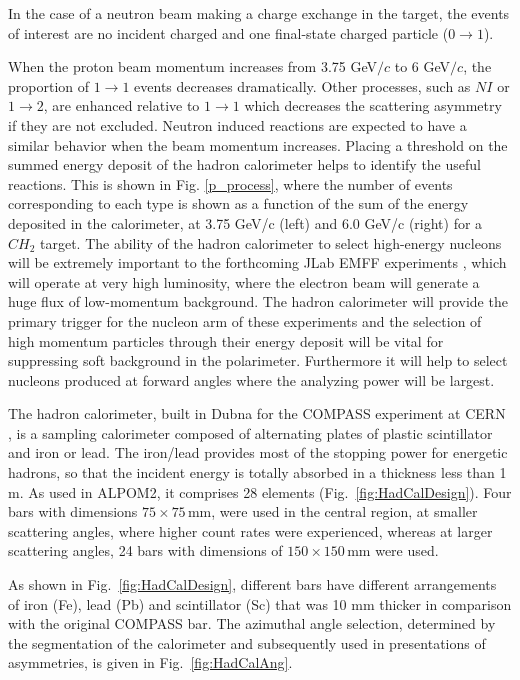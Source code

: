 \documentclass[twocolumn,epjc3]{svjour3}
\begin{document}
In the case of a neutron beam making a charge exchange in the target, the events of interest are no incident charged and one final-state charged particle ($0 \to 1$).

When the proton beam momentum increases from 3.75 GeV$/c$ to 6 GeV$/c$, the proportion of $1 \to 1$ events decreases dramatically. Other processes, such as $NI$ or $1 \to 2$, are enhanced relative to $1 \to 1$ which decreases the scattering asymmetry if they are not excluded. Neutron induced reactions are expected to have a similar behavior when the beam momentum increases. Placing a threshold on the summed energy deposit of the hadron calorimeter helps to identify the useful reactions. This is shown in Fig. \ref{p_process}, where the number of events corresponding to each type is shown as a function of the sum of the energy deposited in the calorimeter, at 3.75 GeV/c (left) and 6.0 GeV/c (right) for a $CH_2$ target. The ability of the hadron calorimeter to select high-energy nucleons will be extremely important to the forthcoming JLab EMFF experiments \cite{PR12-17-004,PR12-07-109}, which will operate at very high luminosity, where the electron beam will generate a huge flux of low-momentum background. The hadron calorimeter will provide the primary trigger for the nucleon arm of these experiments and the selection of high momentum particles through their energy deposit will be vital for suppressing soft background in the polarimeter. Furthermore it will help to select nucleons produced at forward angles where the analyzing power will be largest.

The hadron calorimeter, built in Dubna for the COMPASS experiment at CERN \cite{Vlasov:2006,abbon:2007}, is a sampling calorimeter composed of alternating plates of plastic scintillator and iron or lead. The iron/lead provides most of the stopping power for energetic hadrons, so that the incident energy is totally absorbed in a thickness less than 1 m. As used in ALPOM2, it comprises 28 elements (Fig.~\ref{fig:HadCalDesign}). Four bars with dimensions $75\times75$\,mm, were used in the central region, at smaller scattering angles, where higher count rates were experienced, whereas at larger scattering angles, 24 bars with dimensions of $150\times150$\,mm were used.

As shown in Fig.~\ref{fig:HadCalDesign}, different bars have different arrangements of iron (Fe), lead (Pb) and scintillator (Sc) that was 10 mm thicker in comparison with the original COMPASS bar. The azimuthal angle selection, determined by the segmentation of the calorimeter and subsequently used in presentations of asymmetries, is given in Fig.~\ref{fig:HadCalAng}.
\end{document}
